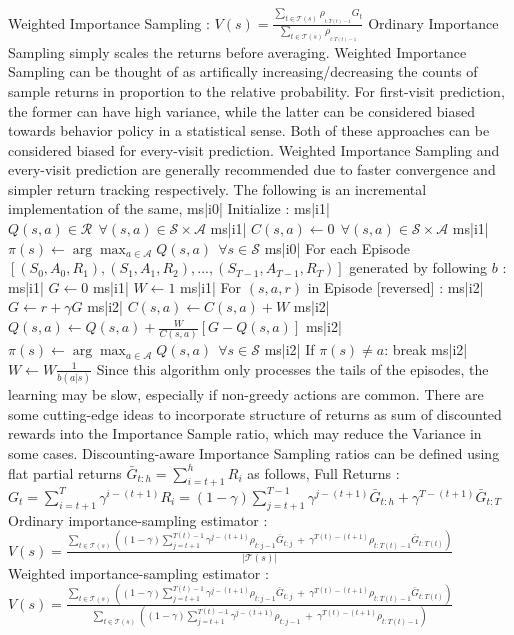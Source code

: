 Weighted Importance Sampling : \( V(s) = \frac{\sum_{t \in \mathcal{T}(s)} \rho_{_{t:T(t) - 1}} G_t}{ \sum_{t \in \mathcal{T}(s)} \rho_{_{t:T(t) - 1}} } \)
Ordinary Importance Sampling simply scales the returns before averaging. Weighted Importance Sampling can be thought of as artifically increasing/decreasing the counts of sample returns in proportion to the relative probability. For first-visit prediction, the former can have high variance, while the latter can be considered biased towards behavior policy in a statistical sense. Both of these approaches can be considered biased for every-visit prediction.
Weighted Importance Sampling and every-visit prediction are generally recommended due to faster convergence and simpler return tracking respectively. The following is an incremental implementation of the same,
ms|i0| Initialize :
ms|i1| \( Q(s, a) \in \mathcal{R} \ \ \forall (s,a) \in \mathcal{S} \times \mathcal{A} \)
ms|i1| \( C(s, a) \leftarrow 0 \ \ \forall (s, a) \in \mathcal{S} \times \mathcal{A} \)
ms|i1| \( \pi(s) \leftarrow \arg\max_{a \in \mathcal{A}} Q(s, a) \ \ \forall s \in \mathcal{S} \)
ms|i0| For each Episode \([(S_0, A_0, R_1), (S_1, A_1, R_2),..., (S_{T-1}, A_{T-1}, R_T)] \) generated by following \( b \) :
ms|i1| \( G \leftarrow 0 \)
ms|i1| \( W \leftarrow 1\)
ms|i1| For \( (s,a,r) \) in Episode [reversed] :
ms|i2| \( G \leftarrow r + \gamma G \)
ms|i2| \( C(s, a) \leftarrow C(s, a) + W \)
ms|i2| \( Q(s,a) \leftarrow Q(s, a) + \frac{W}{C(s, a)} [G - Q(s, a)] \)
ms|i2| \( \pi(s) \leftarrow \arg\max_{a \in \mathcal{A}} Q(s, a) \ \ \forall s \in \mathcal{S} \)
ms|i2| If \( \pi(s) \ne a \): break
ms|i2| \( W \leftarrow W \frac{1}{b(a|s)} \)
Since this algorithm only processes the tails of the episodes, the learning may be slow, especially if non-greedy actions are common. There are some cutting-edge ideas to incorporate structure of returns as sum of discounted rewards into the Importance Sample ratio, which may reduce the Variance in some cases.
Discounting-aware Importance Sampling ratios can be defined using flat partial returns \( \bar{G}_{t:h} = \sum_{i=t+1}^h R_i \) as follows,
Full Returns : \( G_t = \sum_{i=t+1}^T \gamma^{i - (t+1)} R_i = (1 - \gamma) \sum_{j = t+1}^{T-1} \gamma^{j - (t + 1)} \bar{G}_{t:h} + \gamma^{T-(t+1)} \bar{G}_{t:T} \)
Ordinary importance-sampling estimator : \( V(s) = \frac{ \sum_{t \in \mathcal{T}(s)} ( (1 - \gamma) \sum_{j = t+1}^{T(t) - 1} \gamma^{j - (t+1)} \rho_{t:j-1} \bar{G}_{t:j} \ + \ \gamma^{T(t) - (t + 1)} \rho_{t:T(t)-1} \bar{G}_{t:T(t)} ) }{|\mathcal{T}(s)|} \)
Weighted importance-sampling estimator : \( V(s) = \frac{ \sum_{t \in \mathcal{T}(s)} ( (1 - \gamma) \sum_{j = t+1}^{T(t) - 1} \gamma^{j - (t+1)} \rho_{t:j-1} \bar{G}_{t:j} \ + \ \gamma^{T(t) - (t + 1)} \rho_{t:T(t)-1} \bar{G}_{t:T(t)} ) }{ \sum_{t \in \mathcal{T}(s)} ( (1 - \gamma) \sum_{j = t+1}^{T(t) - 1} \gamma^{j - (t+1)} \rho_{t:j-1} \ + \ \gamma^{T(t) - (t + 1)} \rho_{t:T(t)-1} ) } \)